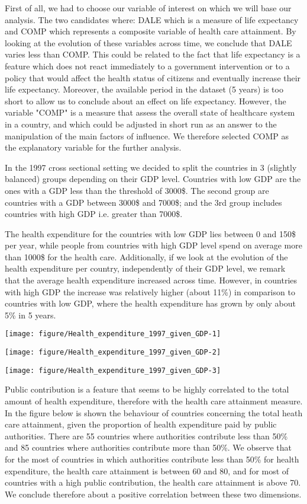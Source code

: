 \documentclass[12pt,a4paper]{article}\usepackage[]{graphicx}\usepackage[]{color}
\makeatletter
\def\maxwidth{ %
  \ifdim\Gin@nat@width>\linewidth
    \linewidth
  \else
    \Gin@nat@width
  \fi
}
\makeatother
\begin{document}
First of all, we had to choose our variable of interest on which we will base our analysis.  The two candidates where: DALE which is a measure of life expectancy and COMP which represents a composite variable of health care attainment. By looking at the evolution of these variables across time, we conclude that DALE varies less than COMP. This could be related to the fact that life expectancy is a feature which does not react immediately to a government intervention or to a policy that would affect the health status of citizens and eventually increase their life expectancy. Moreover, the available period in the dataset (5 years) is too short to allow us to conclude about an effect on life expectancy. However, the variable "COMP" is a measure that assess the overall state of healthcare system in a country, and which could be adjusted in  short run as an answer to the manipulation of the main factors of influence. We therefore selected  COMP as the explanatory variable for the further analysis.

\break

In the 1997 cross sectional setting we decided to split the countries in 3 (slightly balanced) groups depending on their GDP level. Countries with low GDP are the ones with a GDP less than the threshold of 3000\$. The second group are  countries with a GDP between 3000\$ and 7000\$; and the 3rd group includes  countries with high GDP i.e. greater than 7000\$.

The health expenditure for the countries with low GDP lies between 0 and 150\$ per year, while people from countries with  high GDP level spend on average more than 1000\$ for the health care.  Additionally, if we look at the evolution of the health expenditure per country, independently of their GDP level, we remark that the average health expenditure increased across time. However, in countries with high GDP the increase was relatively higher (about 11\%) in comparison to countries with low GDP,  where the health expenditure has grown by only about 5\% in 5 years.


\texttt{[image: figure/Health\_expenditure\_1997\_given\_GDP-1]} 

\texttt{[image: figure/Health\_expenditure\_1997\_given\_GDP-2]} 

\texttt{[image: figure/Health\_expenditure\_1997\_given\_GDP-3]} 

 
Public contribution is a feature that seems to be highly correlated to the total amount of health expenditure, therefore with the health care attainment measure. In the figure below is shown the behaviour of countries concerning the total heath care attainment, given the proportion of health expenditure paid by public authorities.  There are 55 countries where authorities contribute less than 50\% and 85 countries where authorities contribute more than 50\%. We observe that for the most of countries in which authorities contribute less than 50\% for health expenditure, the health care attainment is between 60 and 80, and for most of countries with a high public contribution, the health care attainment is above 70. We conclude therefore about a positive correlation between these two dimensions.
\end{document}
